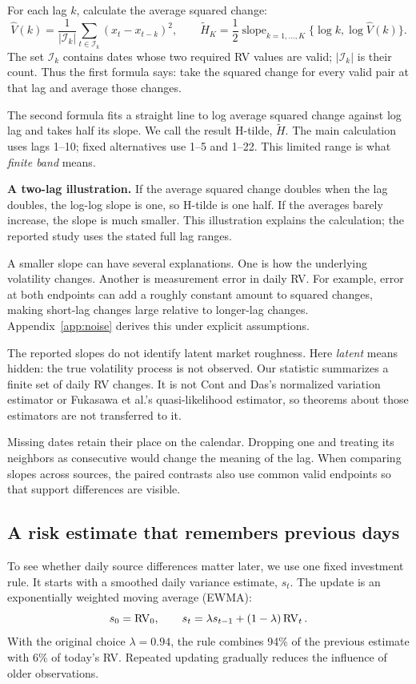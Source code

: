 For each lag $k$, calculate the average squared change:
\begin{equation}
 \widehat V(k)=\frac{1}{|\mathcal I_k|}
       \sum_{t\in\mathcal I_k}(x_t-x_{t-k})^2,\qquad
 \widetilde H_K=\frac12\operatorname{slope}_{k=1,\ldots,K}
       \{\log k,\log\widehat V(k)\}.\label{eq:H}
\end{equation}
The set $\mathcal I_k$ contains dates whose two required RV values are valid; $|\mathcal I_k|$ is their count. Thus the first formula says: take the squared change for every valid pair at that lag and average those changes.

The second formula fits a straight line to log average squared change against log lag and takes half its slope. We call the result H-tilde, $\widetilde H$. The main calculation uses lags 1--10; fixed alternatives use 1--5 and 1--22. This limited range is what \emph{finite band} means.

\textbf{A two-lag illustration.} If the average squared change doubles when the lag doubles, the log-log slope is one, so H-tilde is one half. If the averages barely increase, the slope is much smaller. This illustration explains the calculation; the reported study uses the stated full lag ranges.

A smaller slope can have several explanations. One is how the underlying volatility changes. Another is measurement error in daily RV. For example, error at both endpoints can add a roughly constant amount to squared changes, making short-lag changes large relative to longer-lag changes. Appendix~\ref{app:noise} derives this under explicit assumptions.

The reported slopes do not identify latent market roughness. Here \emph{latent} means hidden: the true volatility process is not observed. Our statistic summarizes a finite set of daily RV changes. It is not Cont and Das's normalized variation estimator or Fukasawa et al.'s quasi-likelihood estimator, so theorems about those estimators are not transferred to it.

Missing dates retain their place on the calendar. Dropping one and treating its neighbors as consecutive would change the meaning of the lag. When comparing slopes across sources, the paired contrasts also use common valid endpoints so that support differences are visible.

\subsection{A risk estimate that remembers previous days}
To see whether daily source differences matter later, we use one fixed investment rule. It starts with a smoothed daily variance estimate, $s_t$. The update is an exponentially weighted moving average (EWMA):
\[
 s_0=\operatorname{RV}_0,\qquad s_t=\lambda s_{t-1}+(1-\lambda)\operatorname{RV}_t.
\]
With the original choice $\lambda=0.94$, the rule combines 94\% of the previous estimate with 6\% of today's RV. Repeated updating gradually reduces the influence of older observations.

